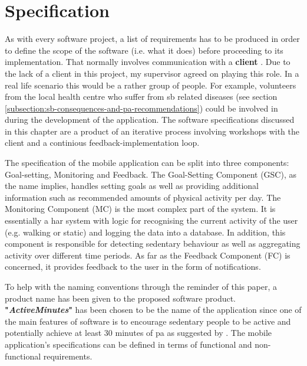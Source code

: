 \chapter{Specification}
\label{Chapter:Specification}

As with every software project, a list of requirements has to be produced in order to define the scope of the software (i.e. what it does) before proceeding to its implementation. That normally involves communication with a \textbf{client} \citep[23]{bell2005}. Due to the lack of a client in this project, my supervisor agreed on playing this role. In a real life scenario this would be a rather group of people. For example, volunteers from the local health centre who suffer from \gls{sb} related diseases (see section \ref{subsection:sb-consequences-and-pa-recommendations}) could be involved in during the development of the application. The software specifications discussed in this chapter are a product of an iterative process involving workshops with the client and a continious feedback-implementation loop.

The specification of the mobile application can be split into three components: Goal-setting, Monitoring and Feedback. The Goal-Setting Component (GSC), as the name implies, handles setting goals as well as providing additional information such as recommended amounts of physical activity per day. The Monitoring Component (MC) is the most complex part of the system. It is essentially a \gls{har} system with logic for recognising the current activity of the user (e.g. walking or static) and logging the data into a database. In addition, this component is responsible for detecting sedentary behaviour as well as aggregating activity over different time periods. As far as the Feedback Component (FC) is concerned, it provides feedback to the user in the form of notifications.

To help with the naming conventions through the reminder of this paper, a product name has been given to the proposed software product. \textbf{"\textit{ActiveMinutes}"} has been chosen to be the name of the application since one of the main features of software is to encourage sedentary people to be active and potentially achieve at least 30 minutes of \gls{pa} as suggested by \citet[7]{departmentofhealth2011}. The mobile application's specifications can be defined in terms of functional and non-functional requirements.

